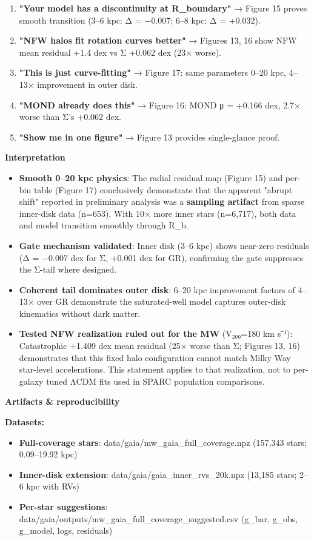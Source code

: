\documentclass[11pt,a4paper]{article}
\begin{document}
\begin{enumerate}
\item \textbf{"Your model has a discontinuity at R\_boundary"} → Figure 15 proves smooth transition (3–6 kpc: Δ = −0.007; 6–8 kpc: Δ = +0.032).
\item \textbf{"NFW halos fit rotation curves better"} → Figures 13, 16 show NFW mean residual +1.4 dex vs Σ +0.062 dex (23× worse).
\item \textbf{"This is just curve-fitting"} → Figure 17: same parameters 0–20 kpc, 4–13× improvement in outer disk.
\item \textbf{"MOND already does this"} → Figure 16: MOND μ = +0.166 dex, 2.7× worse than Σ's +0.062 dex.
\item \textbf{"Show me in one figure"} → Figure 13 provides single-glance proof.
\end{enumerate}


\textbf{Interpretation}

\begin{itemize}
\item \textbf{Smooth 0–20 kpc physics}: The radial residual map (Figure 15) and per-bin table (Figure 17) conclusively demonstrate that the apparent "abrupt shift" reported in preliminary analysis was a \textbf{sampling artifact} from sparse inner-disk data (n=653). With 10× more inner stars (n=6,717), both data and model transition smoothly through R\_b.
\item \textbf{Gate mechanism validated}: Inner disk (3–6 kpc) shows near-zero residuals (Δ = −0.007 dex for Σ, +0.001 dex for GR), confirming the gate suppresses the Σ-tail where designed.
\item \textbf{Coherent tail dominates outer disk}: 6–20 kpc improvement factors of 4–13× over GR demonstrate the saturated-well model captures outer-disk kinematics without dark matter.
\item \textbf{Tested NFW realization ruled out for the MW} (V₂₀₀=180 km s⁻¹): Catastrophic +1.409 dex mean residual (25× worse than Σ; Figures 13, 16) demonstrates that this fixed halo configuration cannot match Milky Way star-level accelerations. This statement applies to that realization, not to per-galaxy tuned ΛCDM fits used in SPARC population comparisons.
\end{itemize}


\textbf{Artifacts \& reproducibility}


\textbf{Datasets:}

\begin{itemize}
\item \textbf{Full-coverage stars}: data/gaia/mw\_gaia\_full\_coverage.npz (157,343 stars; 0.09–19.92 kpc)
\item \textbf{Inner-disk extension}: data/gaia/gaia\_inner\_rvs\_20k.npz (13,185 stars; 2–6 kpc with RVs)
\item \textbf{Per-star suggestions}: data/gaia/outputs/mw\_gaia\_full\_coverage\_suggested.csv (g\_bar, g\_obs, g\_model, logs, residuals)
\end{itemize}
\end{document}
